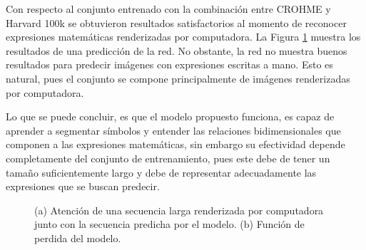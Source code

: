 Con respecto al conjunto entrenado con la combinación entre CROHME y Harvard 100k se obtuvieron resultados satisfactorios al momento de reconocer expresiones matemáticas renderizadas por computadora. La Figura \ref{fig:modelo-harvard-attention}  muestra los resultados de una predicción de la red. No obstante, la red no muestra buenos resultados para predecir imágenes con expresiones escritas a mano. Esto es natural, pues el conjunto se compone principalmente de imágenes renderizadas por computadora. 

Lo que se puede concluir, es que el modelo propuesto funciona, es capaz de aprender a segmentar símbolos y entender las relaciones bidimensionales que componen a las expresiones matemáticas, sin embargo su efectividad depende completamente del conjunto de entrenamiento, pues este debe de tener un tamaño suficientemente largo y debe de representar adecuadamente las expresiones que se buscan predecir.

\begin{figure}[H]
    \centering
    \caption{(a) Atención de una secuencia larga renderizada por computadora junto con la secuencia predicha por el modelo. (b) Función de perdida del modelo.}
    \label{fig:modelo-harvard-attention}
\end{figure} 





